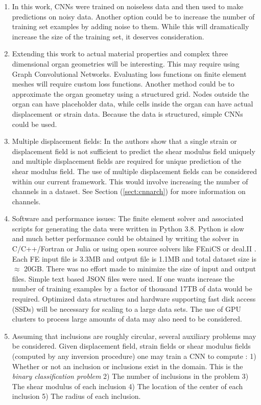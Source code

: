 \documentclass[12pt]{article}
\begin{document}
\begin{enumerate}
\item{In this work, CNNs were trained on noiseless data and then used to make predictions on noisy data. Another option could be to increase the number of training set examples by adding noise to them. While this will dramatically increase the size of the training set, it deserves consideration.}
\item{Extending this work to actual material properties and complex three dimensional organ geometries will be interesting. This may require using Graph Convolutional Networks. Evaluating loss functions on finite element meshes will require custom loss functions. Another method could be to approximate the organ geometry using a structured grid. Nodes outside the organ can have placeholder data, while cells inside the organ can have actual displacement or strain data. Because the data is structured, simple CNNs could be used.}
\item{Multiple displacement fields: In \cite{paper:barbonegokhale,paper:barbonebamber} the authors show that a single strain or displacement field is not sufficient to predict the shear modulus field uniquely and multiple displacement fields are required for unique prediction of the shear modulus field. The use of multiple displacement fields can be considered within our current framework. This would involve increasing the number of channels in a dataset. See Section (\ref{sect:cnnarch}) for more information on channels.} 
\item{Software and performance issues: The finite element solver and associated scripts for generating the data were written in Python 3.8. Python is slow and much better performance could be obtained by writing the solver in C/C++/Fortran or Julia or using open source solvers like FEniCS \cite{paper:fenics} or deal.II \cite{misc:deal.ii}. Each FE input file is 3.3MB and output file is 1.1MB and total dataset size is $\approx$  20GB. There was no effort made to minimize the size of input and output files. Simple text based JSON files were used. If one wants increase the number of training examples by a factor of thousand 17TB of data would be required. Optimized data structures and hardware supporting fast disk access (SSDs) will be necessary for scaling to a large data sets. The use of GPU clusters to process large amounts of data may also need to be considered. }
\item{Assuming that inclusions are roughly circular, several auxiliary problems may be considered. Given displacement field, strain fields or shear modulus fields (computed by any inversion procedure) one may train a CNN to compute : 1) Whether or not an inclusion or inclusions exist  in the domain. This is the \textit{binary classification problem} 2) The number of inclusions in the problem 3) The shear modulus of each inclusion 4) The location of the center of each inclusion 5) The radius of each inclusion. }

\end{enumerate}
\end{document}
